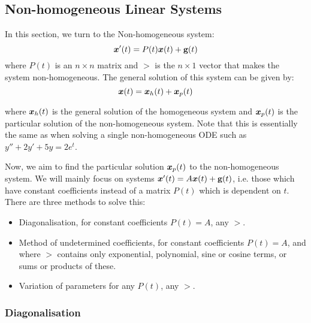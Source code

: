 \subsection{Non-homogeneous Linear Systems}

In this section, we turn to the Non-homogeneous system:
\[
\bm{x}'(t) = P(t) \bm{x}(t) + \textbf{g}(t)
\]
where $P(t)$ is an $n \times n$ matrix and $\gt$ is the $n \times 1$ vector that makes the system non-homogeneous. The general solution of this system can be given by:
\begin{equation}
	\bm{x}(t) = \bm{x}_h(t) + \bm{x}_p(t)
\end{equation}

where $\bm{x}_h(t)$ is the general solution of the homogeneous system and $\bm{x}_p(t)$ is the particular solution of the non-homogeneous system. Note that this is essentially the same as when solving a single non-homogeneous ODE such as $y'' + 2y' + 5y = 2 e^t$.

Now, we aim to find the particular solution $\bm{x}_p(t)$ to the non-homogeneous system. We will mainly focus on systems $\bm{x}'(t) = A\bm{x}(t) + \textbf{g}(t)$, i.e. those which have constant coefficients instead of a matrix $P(t)$ which is dependent on $t$. There are three methods to solve this:
\begin{itemize}
	\item Diagonalisation, for constant coefficients $P(t) = A$, any $\gt$.
	\item Method of undetermined coefficients, for constant coefficients $P(t) = A$, and where $\gt$ contains only exponential, polynomial, sine or cosine terms, or sums or products of these.
	\item Variation of parameters for any $P(t)$, any $\gt$.
\end{itemize}


\subsubsection{Diagonalisation}

